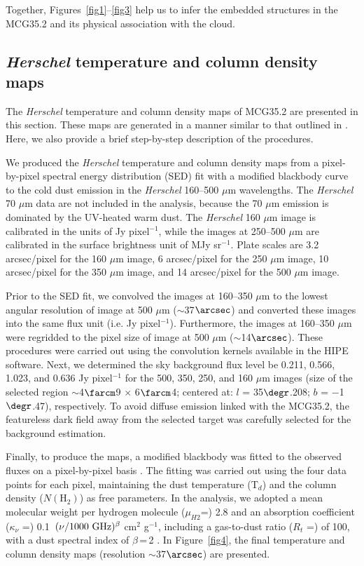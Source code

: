 \documentclass[iop]{emulateapj}
\begin{document}
Together, Figures~\ref{fig1}--\ref{fig3} help us to infer the embedded structures in the MCG35.2 and its physical association with the cloud.
%
\subsection{{\it Herschel} temperature and column density maps}
\label{subsec:temp}
%
The {\it Herschel} temperature and column density maps of MCG35.2 are presented in this section.
These maps are generated in a manner similar to that outlined in \citet{mallick15}.
Here, we also provide a brief step-by-step description of the procedures. 

We produced the {\it Herschel} temperature and column density maps from a  pixel-by-pixel spectral energy distribution (SED) 
fit with a modified blackbody curve to the cold dust emission in the {\it Herschel} 160--500 $\mu$m wavelengths. 
The {\it Herschel} 70 $\mu$m data are not included in the analysis, because the 70 $\mu$m emission is 
dominated by the UV-heated warm dust. The {\it Herschel} 160 $\mu$m image is calibrated in the units of 
Jy pixel$^{-1}$, while the images at 250--500 $\mu$m are calibrated in the surface brightness unit of MJy sr$^{-1}$.
Plate scales are 3.2 arcsec/pixel for the 160 $\mu$m image, 6 arcsec/pixel for the 250 $\mu$m image, 10 arcsec/pixel 
for the 350 $\mu$m image, and 14 arcsec/pixel for the 500 $\mu$m image. 

Prior to the SED fit, we convolved the images at 160--350 $\mu$m to the lowest angular 
resolution of image at 500 $\mu$m ($\sim$37$\arcsec$) and converted these images into the same flux unit (i.e. Jy pixel$^{-1}$). 
Furthermore, the images at 160--350 $\mu$m were regridded  to the pixel size of image at 500 $\mu$m ($\sim$14$\arcsec$). 
These procedures were carried out using the convolution kernels available in the HIPE software. 
Next, we determined the sky background flux level be 0.211, 0.566, 1.023, and 0.636 Jy pixel$^{-1}$ for the 500, 350, 250, and 
160 $\mu$m images (size of the selected region $\sim$4$\farcm$9 $\times$ 6$\farcm$4; 
centered at:  $l$ = 35$\degr$.208; $b$ = $-$1$\degr$.47), respectively. 
To avoid diffuse emission linked with the MCG35.2, the featureless dark field away from the selected target was 
carefully selected for the background estimation. 

Finally, to produce the maps, a modified blackbody was fitted to the observed fluxes on a pixel-by-pixel basis 
\citep[see equations 8 and 9 in][]{mallick15}. 
The fitting was carried out using the four data points for each pixel, maintaining the 
dust temperature (T$_{d}$) and the column density ($N(\mathrm H_2)$) 
as free parameters. 
In the analysis, we adopted a mean molecular weight per hydrogen molecule ($\mu_{H2}$=) 2.8 
\citep{kauffmann08} and an absorption coefficient ($\kappa_\nu$ =) 0.1~$(\nu/1000~{\rm GHz})^{\beta}$ cm$^{2}$ g$^{-1}$, 
including a gas-to-dust ratio ($R_t$ =) of 100, with a dust spectral index of $\beta$\,=\,2 \citep[see][]{hildebrand83}. 
In Figure~\ref{fig4}, the final temperature and column density maps (resolution $\sim$37$\arcsec$) are presented.
\end{document}
